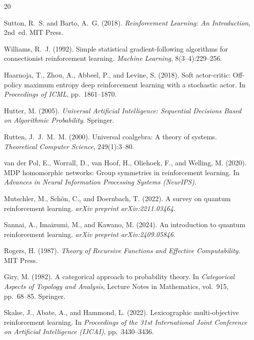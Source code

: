 \documentclass[9pt,a4paper]{article}
\theoremstyle{plain}
\theoremstyle{definition}
\theoremstyle{remark}
\begin{document}
\begin{thebibliography}{20}

Sutton, R.~S. and Barto, A.~G. (2018).
\textit{Reinforcement Learning: An Introduction}, 2nd~ed. MIT Press.

Williams, R.~J. (1992).
Simple statistical gradient-following algorithms for connectionist reinforcement learning.
\textit{Machine Learning}, 8(3--4):229--256.

Haarnoja, T., Zhou, A., Abbeel, P., and Levine, S. (2018).
Soft actor-critic: Off-policy maximum entropy deep reinforcement learning with a stochastic actor.
In \textit{Proceedings of ICML}, pp.~1861--1870.

Hutter, M. (2005).
\textit{Universal Artificial Intelligence: Sequential Decisions Based on Algorithmic Probability}. Springer.

Rutten, J.~J.~M.~M. (2000).
Universal coalgebra: A theory of systems.
\textit{Theoretical Computer Science}, 249(1):3--80.

van der Pol, E., Worrall, D., van Hoof, H., Oliehoek, F., and Welling, M. (2020).
MDP homomorphic networks: Group symmetries in reinforcement learning.
In \textit{Advances in Neural Information Processing Systems (NeurIPS)}.

Mutschler, M., Sch{\"o}n, C., and Doernbach, T. (2022).
A survey on quantum reinforcement learning.
\textit{arXiv preprint arXiv:2211.03464}.

Sannai, A., Imaizumi, M., and Kawano, M. (2024).
An introduction to quantum reinforcement learning.
\textit{arXiv preprint arXiv:2409.05846}.

Rogers, H. (1987).
\textit{Theory of Recursive Functions and Effective Computability}. MIT Press.

Giry, M. (1982).
A categorical approach to probability theory.
In \textit{Categorical Aspects of Topology and Analysis}, Lecture Notes in Mathematics, vol.~915, pp.~68--85. Springer.

Skalse, J., Abate, A., and Hammond, L. (2022).
Lexicographic multi-objective reinforcement learning.
In \textit{Proceedings of the 31st International Joint Conference on Artificial Intelligence (IJCAI)}, pp.~3430--3436.


\end{thebibliography}
\end{document}
